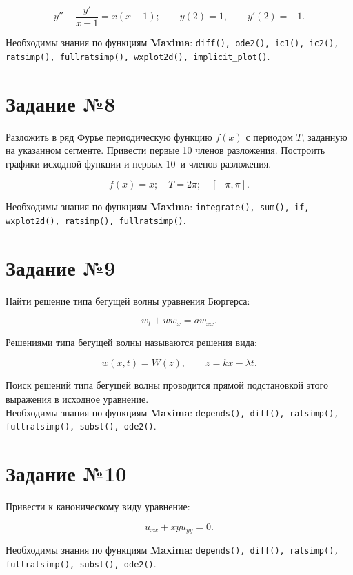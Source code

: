 	\[
		y'' - \frac{y'}{x - 1} = x (x - 1); \qquad y(2) = 1, \qquad y'(2) = -1.
	\]
	
	Необходимы знания по функциям \textbf{Maxima}: {\tt diff(), ode2(), ic1(), ic2(), ratsimp(), fullratsimp(), wxplot2d(), implicit\_plot()}.

\section*{Задание №8}

	Разложить в ряд Фурье периодическую функцию $f(x)$ с периодом $T$, заданную на указанном сегменте. Привести первые 10 членов разложения. Построить графики исходной функции и первых 10--и членов разложения.
	
	\[
		f(x) = x; \quad T = 2 \pi; \quad [-\pi, \pi].
	\]
	
	Необходимы знания по функциям \textbf{Maxima}: {\tt integrate(), sum(), if, wxplot2d(), ratsimp(), fullratsimp()}.

\section*{Задание №9}

    Найти решение типа бегущей волны уравнения Бюргерса:
    
    \[
        w_{t} + w w_{x} = a w_{xx}.
    \]

    Решениями типа бегущей волны называются решения вида:

    \[
        w(x, t) = W(z), \qquad z = k x - \lambda t.
    \]

    Поиск решений типа бегущей волны проводится прямой подстановкой этого выражения в исходное уравнение.\\

    Необходимы знания по функциям \textbf{Maxima}: {\tt depends(), diff(), ratsimp(), fullratsimp(), subst(), ode2()}.

\section*{Задание №10}

	Привести к каноническому виду уравнение:

	\[
		u_{xx} + x y u_{yy} = 0.
	\]

	Необходимы знания по функциям \textbf{Maxima}: {\tt depends(), diff(), ratsimp(), fullratsimp(), subst(), ode2()}.

    \newpage